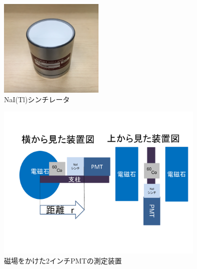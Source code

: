 \begin{figure}[tbp]
	\centering
	\includegraphics[width=5cm]{fig/iguchi/NaIscinti.jpg}
	\caption{NaI(Tl)シンチレータ}
	\label{NaIscinti}
\end{figure}

\begin{figure}[tbp]
	\centering
	\includegraphics[width=10cm]{fig/iguchi/souchizu1.pdf}
	\caption{磁場をかけた2インチPMTの測定装置}
	\label{souchizu1}
\end{figure}

%
     

